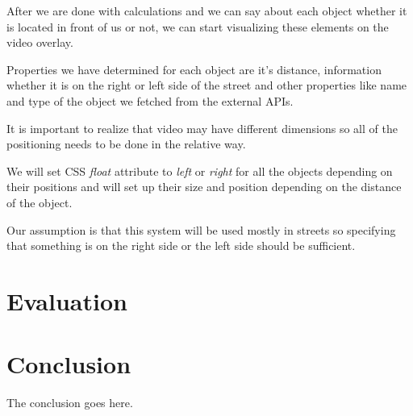 \documentclass[journal]{IEEEtran}
\begin{document}
After we are done with calculations and we can say about each object whether it is located in front of us or not, we can start visualizing these elements on the video overlay.

Properties we have determined for each object are it's distance, information whether it is on the right or left side of the street and other properties like name and type of the object we fetched from the external APIs.

It is important to realize that video may have different dimensions so all of the positioning needs to be done in the relative way.

We will set CSS \textit{float} attribute to \textit{left} or \textit{right} for all the objects depending on their positions and will set up their size and position depending on the distance of the object.

Our assumption is that this system will be used mostly in streets so specifying that something is on the right side or the left side should be sufficient.

\section{Evaluation}


\section{Conclusion}
The conclusion goes here.






%
\end{document}
